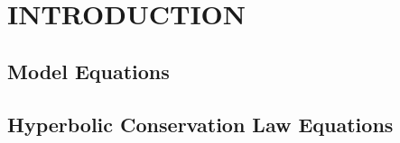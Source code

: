 \chapter{INTRODUCTION}

\section{Model Equations}
  
\section{Hyperbolic Conservation Law Equations}
  
